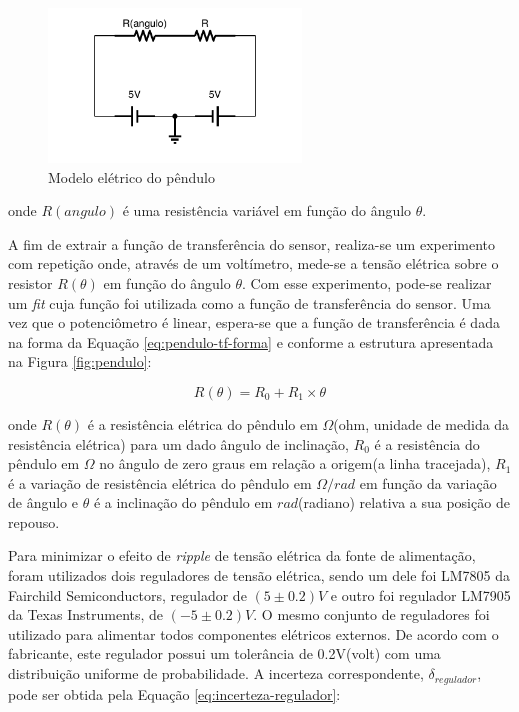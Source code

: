 \documentclass[a4paper]{instrumentacao}
\begin{document}
\begin{figure}[H]
\centering
\includegraphics[width=0.6\textwidth]{Pendulo-Circuito.pdf}
\caption{Modelo elétrico do pêndulo}
\label{fig:pendulo-equivalente}
\end{figure}

\noindent
onde $R(angulo)$ é uma resistência variável em função do ângulo $\theta$.

A fim de extrair a função de transferência do sensor, realiza-se um experimento com repetição onde, através de um voltímetro, mede-se a tensão elétrica sobre o resistor $R(\theta)$ em função do ângulo $\theta$. Com esse experimento, pode-se realizar um \textit{fit} cuja função foi utilizada como a função de transferência do sensor. Uma vez que o potenciômetro é linear, espera-se que a função de transferência é dada na forma da Equação \ref{eq:pendulo-tf-forma} e conforme a estrutura apresentada na Figura \ref{fig:pendulo}:

\begin{equation}
	R(\theta) = R_0 + R_1 \times \theta
	\label{eq:pendulo-tf-forma}
\end{equation}

\noindent
onde $R(\theta)$ é a resistência elétrica do pêndulo em $\Omega$(ohm, unidade de medida da resistência elétrica) para um dado ângulo de inclinação, $R_0$ é a resistência do pêndulo em $\Omega$ no ângulo de zero graus em relação a origem(a linha tracejada), $R_1$ é a variação de resistência elétrica do pêndulo em $\Omega / rad$ em função da variação de ângulo e $\theta$ é a inclinação do pêndulo em $rad$(radiano) relativa a sua posição de repouso.

Para minimizar o efeito de \textit{ripple} de tensão elétrica da fonte de alimentação, foram utilizados dois reguladores de tensão elétrica, sendo um dele foi LM7805 da Fairchild Semiconductors, regulador de $(5 \pm 0.2)V$\cite{datasheet-lm7805} e outro foi regulador LM7905 da Texas Instruments, de $(-5 \pm 0.2)V$\cite{datasheet-lm7905}. O mesmo conjunto de reguladores foi utilizado para alimentar todos componentes elétricos externos. De acordo com o fabricante, este regulador possui um tolerância de 0.2V(volt) com uma distribuição uniforme de probabilidade. A incerteza correspondente, $\delta_{regulador}$, pode ser obtida pela Equação \ref{eq:incerteza-regulador}:
\end{document}
